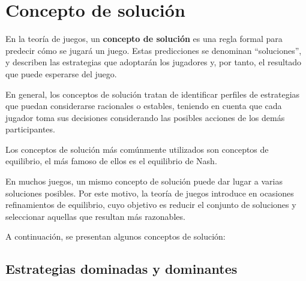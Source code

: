 \documentclass[12pt,a4paper,]{book}
\title{}
\author{Nombre Completo Autor}
\date{18/11/2021}
\def\ifdoblecara{} %
\def\ifprincipal{} %
\let\ifprincipal\undefined %
\numberwithin{dummy}{section}
\theoremstyle{ocrenumbox}
\theoremstyle{blacknumex}
\theoremstyle{blacknumbox}
\theoremstyle{ocrenum}
\theoremstyle{ocrenum}
\begin{document}




\raggedbottom

\ifdefined\ifprincipal
\else
\setlength{\parindent}{1em}
\pagestyle{fancy}
\setcounter{tocdepth}{4}
\tableofcontents

\fi

\ifdefined\ifdoblecara
\fancyhead{}{}
\fancyhead[LE,RO]{\scriptsize\rightmark}
\fancyfoot[LO,RE]{\scriptsize\slshape \leftmark}
\fancyfoot[C]{}
\fancyfoot[LE,RO]{\footnotesize\thepage}
\else
\fancyhead{}{}
\fancyhead[RO]{\scriptsize\rightmark}
\fancyfoot[LO]{\scriptsize\slshape \leftmark}
\fancyfoot[C]{}
\fancyfoot[RO]{\footnotesize\thepage}
\fi

\renewcommand{\headrulewidth}{0.4pt}
\renewcommand{\footrulewidth}{0.4pt}

\chapter{Concepto de solución}\label{concepto-de-soluciuxf3n}

En la teoría de juegos, un \textbf{concepto de solución} es una regla
formal para predecir cómo se jugará un juego. Estas predicciones se
denominan ``soluciones'', y describen las estrategias que adoptarán los
jugadores y, por tanto, el resultado que puede esperarse del juego.

En general, los conceptos de solución tratan de identificar perfiles de
estrategias que puedan considerarse racionales o estables, teniendo en
cuenta que cada jugador toma sus decisiones considerando las posibles
acciones de los demás participantes.

Los conceptos de solución más comúnmente utilizados son conceptos de
equilibrio, el más famoso de ellos es el equilibrio de Nash.

En muchos juegos, un mismo concepto de solución puede dar lugar a varias
soluciones posibles. Por este motivo, la teoría de juegos introduce en
ocasiones refinamientos de equilibrio, cuyo objetivo es reducir el
conjunto de soluciones y seleccionar aquellas que resultan más
razonables.

A continuación, se presentan algunos conceptos de solución:

\section{Estrategias dominadas y
dominantes}\label{estrategias-dominadas-y-dominantes}
\end{document}
